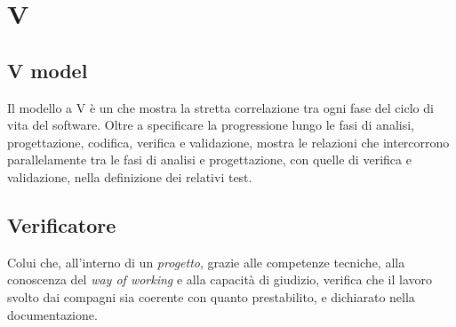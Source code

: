 \chapter{V}

\section{V model}
Il modello a V è un  che mostra la stretta correlazione tra ogni fase del ciclo di vita del software. Oltre a specificare la progressione lungo le fasi di analisi, progettazione, codifica, verifica e validazione, mostra le relazioni che intercorrono parallelamente tra le fasi di analisi e progettazione, con quelle di verifica e validazione, nella definizione dei relativi test.

\section{Verificatore}\label{sec:Verificatori}
Colui che, all'interno di un \emph{progetto}, grazie alle competenze tecniche, alla conoscenza del \emph{way of working} e alla capacità di giudizio, verifica che il lavoro svolto dai compagni sia coerente con quanto prestabilito, e dichiarato nella documentazione.
